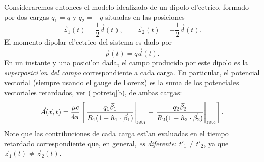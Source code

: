 Consideraremos entonces el modelo idealizado de un dipolo el'ectrico, formado por dos cargas $q_1=q$ y $q_2=-q$ situadas en las posiciones
\begin{equation}
 \vec{z}_1(t)=\frac{1}{2}\vec{d}(t), \qquad \vec{z}_2(t)=-\frac{1}{2}\vec{d}(t).
\end{equation}
El momento dipolar el'ectrico del sistema es dado por
\begin{equation}
 \vec{p}(t)=q\vec{d}(t).
\end{equation}
En un instante y una posici'on dada, el campo producido por este dipolo es la \textit{superposici'on del campo} correspondiente a cada carga. En particular, el potencial vectorial (siempre usando el gauge de Lorenz) es la suma de los potenciales vectoriales retardados, ver (\ref{potretq}b), de ambas cargas:
\begin{equation}
\vec{A}(\vec{x},t)=\frac{\mu c}{4\pi}\left[\left.\frac{q_1\vec{\beta}_1}{R_1(1-\hat{n}_1\cdot\vec{\beta}_1)}\right|_{{\rm ret}_1} +\left.\frac{q_2\vec{\beta}_2}{R_2(1-\hat{n}_2\cdot\vec{\beta}_2)}\right|_{{\rm ret}_2}\right].
\end{equation}
Note que las contribuciones de cada carga est'an evaluadas en el tiempo retardado correspondiente que, en general, \textit{es diferente}: $t'_1\neq t'_2$, ya que $\vec{z}_1(t)\neq\vec{z}_2(t)$.

